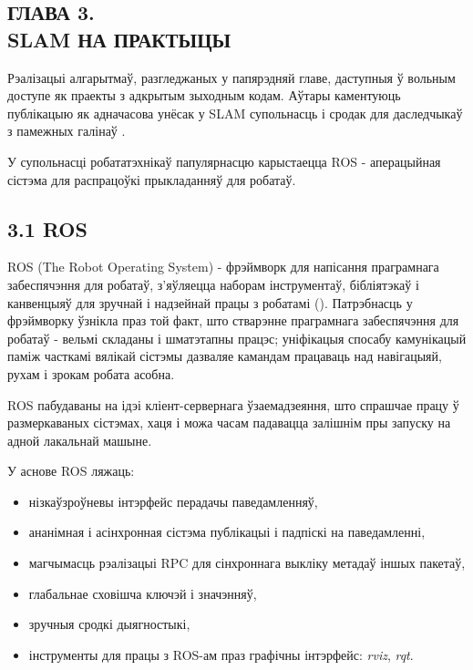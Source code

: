 \begin{center}
    \section*{ГЛАВА 3. \\ SLAM НА ПРАКТЫЦЫ}
\end{center}

Рэалізацыі алгарытмаў, разгледжаных у папярэдняй главе, даступныя ў вольным доступе
як праекты з адкрытым зыходным кодам. Аўтары каментуюць публікацыю як адначасова
унёсак у SLAM супольнасць і сродак для даследчыкаў з памежных галінаў \cite{murORB2}.

У супольнасці робататэхнікаў папулярнасцю карыстаецца ROS - аперацыйная сістэма для
распрацоўкі прыкладанняў для робатаў.

\vspace{5mm}

\subsection*{3.1 ROS}

ROS (The Robot Operating System) - фрэймворк для напісання праграмнага забеспячэння
для робатаў, з'яўляецца наборам інструментаў, бібліятэкаў і
канвенцыяў для зручнай і надзейнай працы з робатамі (\cite{288}). Патрэбнасць у фрэймворку ўзнікла
праз той факт, што стварэнне праграмнага забеспячэння для робатаў -
вельмі складаны і шматэтапны працэс; уніфікацыя спосабу камунікацый паміж часткамі вялікай
сістэмы дазваляе камандам працаваць над навігацыяй, рухам і зрокам робата асобна.

ROS пабудаваны на ідэі кліент-сервернага ўзаемадзеяння, што спрашчае працу ў размеркаваных
сістэмах, хаця і можа часам падавацца залішнім пры запуску на адной лакальнай машыне.

У аснове ROS ляжаць:

\begin{itemize}
  \item нізкаўзроўневы інтэрфейс перадачы паведамленняў,
  \item ананімная і асінхронная сістэма публікацыі і падпіскі на паведамленні,
  \item магчымасць рэалізацыі RPC для сінхроннага выкліку метадаў іншых пакетаў,
  \item глабальнае сховішча ключэй і значэнняў,
  \item зручныя сродкі дыягностыкі,
  \item інструменты для працы з ROS-ам праз графічны інтэрфейс: \textit{rviz}, \textit{rqt}.
\end{itemize}

